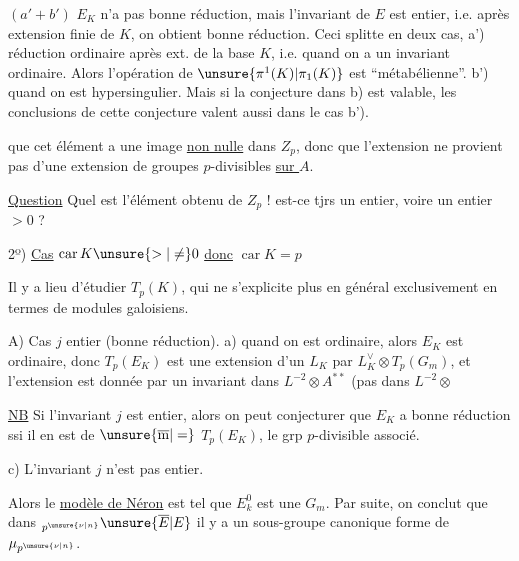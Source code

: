 $(a'+b')$ $E_K$ n'a pas  bonne réduction, mais l'invariant de $E$ est entier, i.e. après extension finie de $K$, on obtient bonne réduction. Ceci splitte en deux cas, a') réduction ordinaire après ext. de la base $K$, i.e. quand on a un invariant ordinaire. Alors l'opération de $\unsure{\pi^1(K)|\pi_1(K)}$ est ``métabélienne''. b') quand on est hypersingulier. Mais  si la conjecture dans b) est valable, les conclusions de cette conjecture valent aussi dans le cas b').


que cet élément a une image \uline{non nulle} dans $Z_p$, donc que l'extension ne provient pas d'une extension de groupes $p$-divisibles \uline{sur $A$}.

\uline{Question} Quel est l'élément obtenu de $Z_p$ ! est-ce tjrs un entier, voire un entier $>0$ ?

2º) \uline{Cas} $\operatorname{car}K\unsure{>|\ne}0$ \uline{donc} $\operatorname{car}K=p$

 Il y a lieu d'étudier $T_p(K)$, qui ne s'explicite plus en général exclusivement en termes de modules galoisiens.

A) Cas $j$ entier (bonne réduction). a)  quand on est ordinaire, alors $E_K$ est ordinaire, donc
$T_p(E_K)$ est une extension d'un $L_K$ par $L_K^{\vee}\otimes T_p(G_m)$, et l'extension est donnée par un invariant dans $L^{-2}\otimes A^{**}$ (pas  dans $L^{-2}\otimes$


\uline{NB} Si l'invariant $j$ est entier, alors on peut conjecturer que  $E_K$ a bonne réduction ssi il en est de $\unsure{\overline{\mathrm m}|=}$ $T_p(E_K)$, le grp $p$-divisible associé.

c) L'invariant $j$ n'est pas entier.

Alors le \uline{modèle de \uline{Néron}}  est tel que $E_k^0$ est une  $G_m$. Par suite, on conclut que dans ${}_{p^{\unsure{\nu|n}}}\unsure{\overline E|E}$ il y a un sous-groupe canonique  forme de $\mu_{p^{\unsure{\nu|n}}}$.

